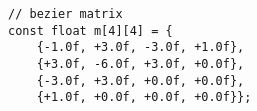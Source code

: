 \begin{lstlisting}
// bezier matrix
const float m[4][4] = {
    {-1.0f, +3.0f, -3.0f, +1.0f},
    {+3.0f, -6.0f, +3.0f, +0.0f},
    {-3.0f, +3.0f, +0.0f, +0.0f},
    {+1.0f, +0.0f, +0.0f, +0.0f}};
\end{lstlisting}
